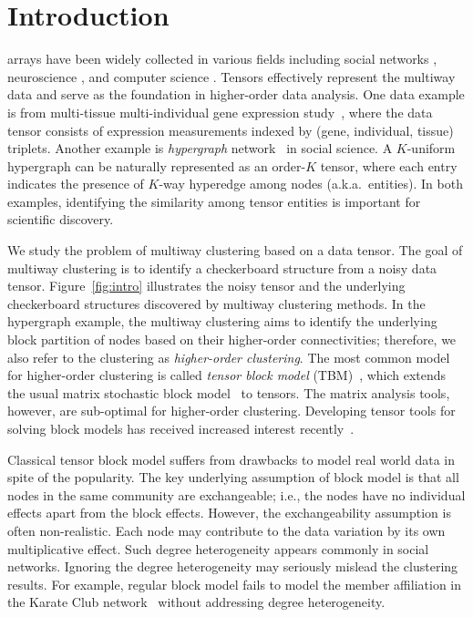 \documentclass[lettersize,onecolumn,journal]{IEEEtran}
\theoremstyle{definition}
\theoremstyle{definition}
\begin{document}
\section{Introduction}\label{sec:intro}
 arrays have been widely collected in various fields including social networks \citep{anandkumar2014tensor}, neuroscience \citep{wang2017bayesian}, and computer science \citep{koniusz2016sparse}. Tensors effectively represent the multiway data and serve as the foundation in higher-order data analysis. One data example is from multi-tissue multi-individual gene expression study~\citep{wang2019three,hore2016tensor}, where the data tensor consists of expression measurements indexed by (gene, individual, tissue) triplets. Another example is \emph{hypergraph} network~\citep{ghoshdastidar2017uniform,ghoshdastidar2017consistency,ahn2019community,ke2019community} in social science. A $K$-uniform hypergraph can be naturally represented as an order-$K$ tensor, where each entry indicates the presence of $K$-way hyperedge among nodes (a.k.a.\ entities). In both examples, identifying the similarity among tensor entities is important for scientific discovery. 


We study the problem of multiway clustering based on a data tensor. The goal of multiway clustering is to identify a checkerboard structure from a noisy data tensor. Figure~\ref{fig:intro} illustrates the noisy tensor and the underlying checkerboard structures discovered by multiway clustering methods. In the hypergraph example, the multiway clustering aims to identify the underlying block partition of nodes based on their higher-order connectivities; therefore, we also refer to the clustering as \emph{higher-order clustering}. The most common model for higher-order clustering is called \emph{tensor block model} (TBM)~\citep{wang2019multiway}, which extends the usual matrix stochastic block model~\citep{abbe2017community} to tensors. The matrix analysis tools, however, are sub-optimal for higher-order clustering. Developing tensor tools for solving block models has received increased interest recently~\citep{ wang2019multiway,chi2020provable,han2020exact}. 


Classical tensor block model suffers from drawbacks to model real world data in spite of the popularity. The key underlying assumption of block model is that all nodes in the same community are exchangeable; i.e., the nodes have no individual effects apart from the block effects. However, the exchangeability assumption is often non-realistic. Each node may contribute to the data variation by its own multiplicative effect. Such degree heterogeneity appears commonly in social networks. Ignoring the degree heterogeneity may seriously mislead the clustering results. For example, regular block model fails to model the member affiliation in the Karate Club network~\citep{bickel2009nonparametric} without addressing degree heterogeneity. 
\end{document}
